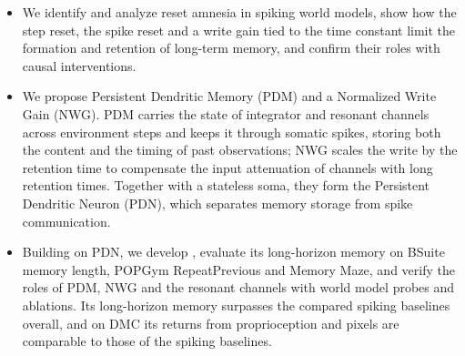 \begin{itemize}
\item We identify and analyze reset amnesia in spiking world models, show how the step reset, the spike reset and a write gain tied to the time constant limit the formation and retention of long-term memory, and confirm their roles with causal interventions.
\item We propose Persistent Dendritic Memory (PDM) and a Normalized Write Gain (NWG). PDM carries the state of integrator and resonant channels across environment steps and keeps it through somatic spikes, storing both the content and the timing of past observations; NWG scales the write by the retention time to compensate the input attenuation of channels with long retention times. Together with a stateless soma, they form the Persistent Dendritic Neuron (PDN), which separates memory storage from spike communication.
\item Building on PDN, we develop \method, evaluate its long-horizon memory on BSuite memory length, POPGym RepeatPrevious and Memory Maze, and verify the roles of PDM, NWG and the resonant channels with world model probes and ablations. Its long-horizon memory surpasses the compared spiking baselines overall, and on DMC its returns from proprioception and pixels are comparable to those of the spiking baselines.
\end{itemize}
